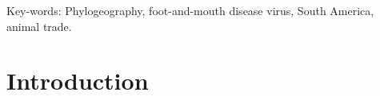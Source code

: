 \documentclass[10pt]{article}
\begin{document}
Key-words: Phylogeography, foot-and-mouth disease virus, South America, animal trade.


\section*{Introduction}

\end{document}

